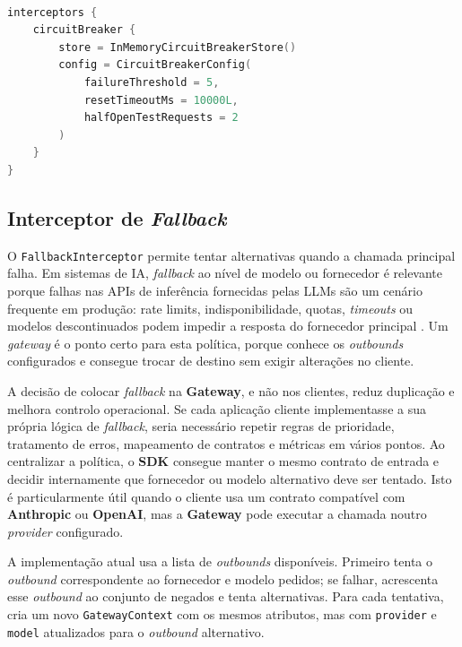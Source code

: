     \vspace{0.5em}
    \begin{lstlisting}[language=kotlin, caption={DSL de configuração do \textit{interceptor} de \textit{circuit breaker}}]

interceptors {
    circuitBreaker {
        store = InMemoryCircuitBreakerStore()
        config = CircuitBreakerConfig(
            failureThreshold = 5,
            resetTimeoutMs = 10000L,
            halfOpenTestRequests = 2
        )
    }
}
    \end{lstlisting}

    \subsection{Interceptor de \textit{Fallback}}
    O \texttt{FallbackInterceptor} permite tentar alternativas quando a chamada principal falha. Em sistemas de IA, \textit{fallback} ao nível de modelo ou fornecedor é relevante porque falhas nas APIs de inferência fornecidas pelas LLMs são um cenário frequente em produção: rate limits, indisponibilidade, quotas, \textit{timeouts} ou modelos descontinuados podem impedir a resposta do fornecedor principal \cite{ai_fallback_tombas,portkey_fallback}. Um \textit{gateway} é o ponto certo para esta política, porque conhece os \textit{outbounds} configurados e consegue trocar de destino sem exigir alterações no cliente.

    A decisão de colocar \textit{fallback} na \textbf{Gateway}, e não nos clientes, reduz duplicação e melhora controlo operacional. Se cada aplicação cliente implementasse a sua própria lógica de \textit{fallback}, seria necessário repetir regras de prioridade, tratamento de erros, mapeamento de contratos e métricas em vários pontos. Ao centralizar a política, o \textbf{SDK} consegue manter o mesmo contrato de entrada e decidir internamente que fornecedor ou modelo alternativo deve ser tentado. Isto é particularmente útil quando o cliente usa um contrato compatível com \textbf{Anthropic} ou \textbf{OpenAI}, mas a \textbf{Gateway} pode executar a chamada noutro \textit{provider} configurado.

    A implementação atual usa a lista de \textit{outbounds} disponíveis. Primeiro tenta o \textit{outbound} correspondente ao fornecedor e modelo pedidos; se falhar, acrescenta esse \textit{outbound} ao conjunto de negados e tenta alternativas. Para cada tentativa, cria um novo \texttt{GatewayContext} com os mesmos atributos, mas com \texttt{provider} e \texttt{model} atualizados para o \textit{outbound} alternativo.

